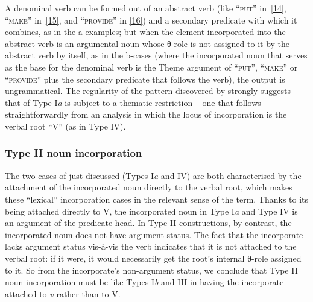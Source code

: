 \documentclass[output=paper]{langsci/langscibook}
\begin{document}
\begin{refcontext}
\ea \label{15}
    \z
\z

\ea \label{16}
    \z
\z
A denominal verb can be formed out of an abstract verb (like
\enquote{\textsc{put}} in~\eqref{14}, \enquote{\textsc{make}} in~\eqref{15},
and \enquote{\textsc{provide}} in \eqref{16}) and a secondary predicate with
which it combines, as in the a-examples; but when the element incorporated into
the abstract verb is an argumental noun whose θ{}-role is not assigned to it by
the abstract verb by itself, as in the b-cases (where the incorporated noun
that serves as the base for the denominal verb is the Theme argument of
\enquote{\textsc{put}}, \enquote{\textsc{make}} or \enquote{\textsc{provide}}
plus the secondary predicate that follows the verb), the output is
ungrammatical. The regularity of the pattern discovered by \cite{halekeyser}
strongly suggests that  of Type I\emph{a} is subject to a
thematic restriction -- one that follows straightforwardly from an analysis in
which the locus of incorporation is the verbal root \enquote{V} (as in Type
IV).

\subsubsection{Type II noun incorporation}

The two cases of  just discussed (Types I\emph{a} and IV) are
both characterised by the attachment of the incorporated noun directly to the
verbal root, which makes these \enquote{lexical} incorporation cases in the
relevant sense of the term. Thanks to its being attached directly to V, the
incorporated noun in Type I\emph{a} and Type IV is an argument of the predicate
head. In Type II constructions, by contrast, the incorporated noun does not
have argument status. The fact that the incorporate lacks argument status
vis-\`a-vis the verb indicates that it is not attached to the verbal root: if
it were, it would necessarily get the root's internal θ{}-role assigned to it.
So from the incorporate's non-argument status, we conclude that Type II noun
incorporation must be like Types I\emph{b} and III in having the incorporate
attached to \emph{v} rather than to V.


\end{refcontext}
\end{document}
